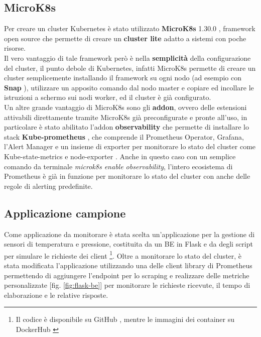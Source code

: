 \subsection{MicroK8s}
Per creare un cluster Kubernetes è stato utilizzato \textbf{MicroK8s} 1.30.0 \cite{MicroK8s}, framework open source che permette di creare un \textbf{cluster lite} adatto a sistemi con poche risorse. \\
Il vero vantaggio di tale framework però è nella \textbf{semplicità} della configurazione del cluster, il punto debole di Kubernetes, infatti MicroK8s permette di creare un cluster semplicemente installando il framework su ogni nodo (ad esempio con \textbf{Snap} \cite{Snap}), utilizzare un apposito comando dal nodo master e copiare ed incollare le istruzioni a schermo sui nodi worker, ed il cluster è già configurato. \\
Un altre grande vantaggio di MicroK8s sono gli \textbf{addon}, ovvero delle estensioni attivabili direttamente tramite MicroK8s già preconfigurate e pronte all'uso, in particolare è stato abilitato l'addon \textbf{observability} che permette di installare lo stack \textbf{Kube-prometheus} \cite{Kube-prometheus}, che comprende il Prometheus Operator, Grafana, l'Alert Manager e un insieme di exporter per monitorare lo stato del cluster come Kube-state-metrics \cite{Kube-state-metrics} e node-exporter \cite{Node-exporter}. Anche in questo caso con un semplice comando da terminale \textit{microk8s enable observability}, l'intero ecosistema di Prometheus è già in funzione per monitorare lo stato del cluster con anche delle regole di alerting predefinite.

\subsection{Applicazione campione}
Come applicazione da monitorare è stata scelta un'applicazione per la gestione di sensori di temperatura e pressione, costituita da un BE in Flask e da degli script per simulare le richieste dei client \footnote{Il codice è disponibile su GitHub \cite{github-repo}, mentre le immagini dei container su DockerHub \cite{docker-images}}.
Oltre a monitorare lo stato del cluster, è stata modificata l'applicazione utilizzando una delle client library di Prometheus permettendo di aggiungere l'endpoint per lo scraping e realizzare delle metriche personalizzate [fig. \ref{fig:flask-be}] per monitorare le richieste ricevute, il tempo di elaborazione e le relative risposte.


